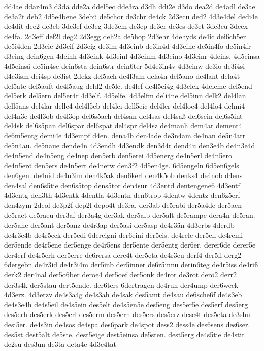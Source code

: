 {dd4ae
ddar4m3
d3dä
dde2a
ddel5ec
dde3ra
d3dh
ddi2e
d3do
dea2d
de4adl
de3ae
de3a2t
deb2
4d5e4bene
3debü
de5chor
de3chr
de4ck
2d3ecu
ded2
4d3e4del
dedi4e
de4dit
dee2
de3eb
3de3ef
de3eg
3de3em
de3ep
de3er
de3es
de3et
3de3eu
3deex
de4fa.
2d3eff
def2l
deg2
2d3egg
deh2a
de5hop
2d3ehr
4dehyds
de4ic
dei6ch5er
de5i4den
2d3eie
2d3eif
2d3eig
de3im
4d3einb
de3in4d
4d3eine
de5in4fo
de5in4fr
d3eing
dein6gen
4deinh
4d3eink
4d3einl
4d3einm
4d3eino
4d3einr
4deins.
4d5einsa
4d5einsä
de5in4se
dein6sta
dein6str
dein6ter
5d4e3in4v
4d3einw
de3io
de3i4si
d4e3ism
dei4sp
de3ist
2dekz
del5ach
de4l3am
dela4n
del5ano
de4lant
dela4t
del5ate
del5auft
de4l5aug
deld2
de5le.
de4lef
de4l5ei4g
4d3elek
4deleme
del5end
del5erk
del5ern
del5er4r
4d3elf.
4d5elfe.
4d3elfm
deli4ne
del5inn
delk2
del4lan
dell5ans
del4lar
delle4
del4l5eb
del4lei
dell5eic
del4ler
del4loe4
del4lö4
delmi4
del4n3e
de4l3ob
de4l3op
del6s5ach
del4san
del4sas
del4saß
del6sein
del6s5int
del4sk
del6s5pan
del6spar
del6spat
del4spr
del4sz
de4manh
dem4ar
dement4
de6m5entg
demi4e
4d3empf
d4en.
dena4b
den4ade
de3n4am
de4nan
de5n4arr
de5n4au.
de5naue
dende4n
4d3endh
4d3endk
den3d4r
dend4u
den3e4b
de4n3e4d
de4n5end
de4n5eng
de4nep
den5erb
den5erei
4d5energ
de4n5erl
de4n5ero
de4n5erö
den5ers
de4n5ert
de4nerw
den3f2
4d5en4ge.
6d5engeln
6d5en6gels
den6gen.
de4nid
de4n3im
den4k5ak
den6kerl
den4k5ob
denks4
de4nob
d4ens
den4sal
den6s5tie
den6s5top
dens5tor
den4sur
4d3entd
dentengene6
4d3entf
4d3entg
den3th
4d3entk
4dentla
4d3entn
den6trop
4dentw
4dentz
den6z5erf
den4zym
2deol
de3p2f
dep2l
depo4t
de3ra.
der3ab
de5rabi
der5a4de
der5aen
de5raet
de5raeu
der3af
der3a4g
der3ak
der5alb
der5alt
de5rampe
dera4n
de5ran.
der5ane
der5ant
der5anz
de4r3ap
der5asi
der5asp
de4r3än
4d3erbs
4derdb
de4r3e4b
de4r5eck
der5edi
6dereigni
der6eini
der5eis.
de4rele
der5ell
de4remi
der5ende
de4r5ene
der5enge
de4r5ens
der5ente
der5entg
der6er.
derer6de
derer5e
der4erf
de4r5erh
der5erre
de6rersa
dere4t
der5eta
de4r3eu
derf4
der5fl
derg2
6dergebn
de4r3id
de4r3i4m
der5inb
der5inner
de6r5innu
derin6teg
de4r5iss
de4riß
derk2
der4nal
der5o6ber
deroe4
der5oef
der5onk
de4ror
de3rot
derö2
derr2
der3s4k
der5stau
dert5ende.
der6ters
6dertragen
de4ruh
der4ump
der6weck
4d3erz.
4d3erzv
de4s3a4g
de4s3ah
de4sak
des5amt
de4sau
de6sche6f
de4s3eb
de4s3e4h
de4s5eil
de4s5ein
des5elt
de4s5en5e
des5eng
des5er5e
des5erf
des5erg
des5erh
des5erk
des5erl
des5erm
des5ern
des5ers
des5erz
dese4t
des5eta
de3shu
desi5er.
de4s3in
de4sos
de4spa
des6park
de4spot
dess2
dess4e
des6sens
des6ser.
des5st
dest5alt
de5ste.
dest5eige
dest5einsa
de5sten.
dest5erg
de4s5tie
de4stit
de2su
des3un
de3ta
deta4c
4d3e4tat
}
